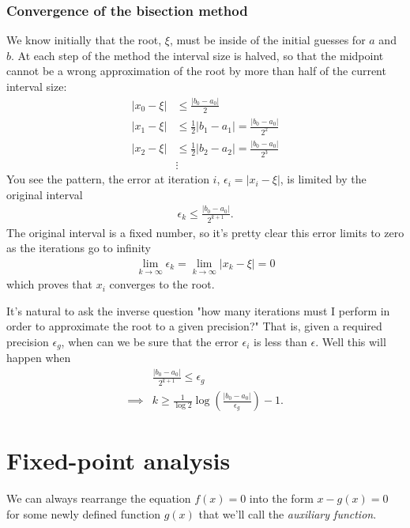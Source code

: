 \subsubsection*{Convergence of the bisection method}
We know initially that the root, $\xi$, must be inside of the initial guesses for $a$ and $b$. At each step of the method the interval size is halved, so that the midpoint cannot be a wrong approximation of the root by more than half of the current interval size: 
\begin{align*}
|x_0 - \xi| &\leq \frac{|b_0 - a_0|}{2} \\
|x_1 - \xi| &\leq \frac{1}{2}|b_1 - a_1| = \frac{|b_0 - a_0|}{2^2} \\
|x_2 - \xi| &\leq \frac{1}{2}|b_2 - a_2| = \frac{|b_0 - a_0|}{2^3} \\
& \vdots
\end{align*}
You see the pattern, the error at iteration $i$, $\epsilon_i=|x_i - \xi|$, is limited by the original interval 
\begin{align*}
\epsilon_k \leq \frac{|b_0 - a_0|}{2^{k+1}}.
\end{align*}
The original interval is a fixed number, so it's pretty clear this error limits to zero as the iterations go to infinity
\begin{align*}
\lim_{k\to \infty} \epsilon_k = \lim_{k\to \infty} |x_k - \xi| = 0
\end{align*}
which proves that $x_i$ converges to the root.

It's natural to ask the inverse question "how many iterations must I perform in order to approximate the root to a given precision?" That is, given a required precision $\epsilon_g$, when can we be sure that the error $\epsilon_i$ is less than $\epsilon$. Well this will happen when
\begin{align*}
& \frac{|b_0 - a_0|}{2^{k+1}} \leq \epsilon_g \\
\implies & k \geq \frac{1}{\log 2}\log \left(\frac{|b_0 - a_0|}{\epsilon_g}\right) - 1.
\end{align*}

\section{Fixed-point analysis}

We can always rearrange the equation $f(x)=0$ into the form $x-g(x)=0$ for some newly defined function $g(x)$ that we'll call the \textit{auxiliary function}.

